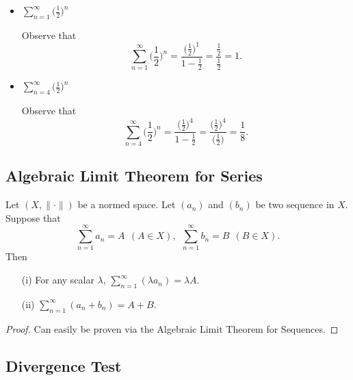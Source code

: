 \documentclass[a4paper]{article}
\begin{document}
\begin{eg}
    \begin{itemize}
        \item \( \sum_{ n=1  }^{ \infty   } \Big(  \frac{ 1 }{ 2 }  \Big)^{n} \)

            Observe that 
            \[  \sum_{ n=1  }^{ \infty  } \Big(  \frac{ 1 }{ 2 }  \Big)^{n} = \frac{ \Big(  \frac{ 1 }{ 2 }  \Big)^{1} }{  1 - \frac{ 1 }{ 2 }  }  = \frac{ \frac{ 1 }{ 2 }  }{ \frac{ 1 }{ 2 }  }  = 1.  \]

        \item \( \sum_{ n=4 }^{ \infty  } \Big(  \frac{ 1 }{ 2 }  \Big)^{n}  \)

            Observe that 
            \[  \sum_{ n=4 }^{ \infty  } \Big(  \frac{ 1 }{ 2 }  \Big)^{n} = \frac{ \Big(  \frac{ 1 }{ 2 }  \Big)^{4} }{  1 - \frac{ 1 }{ 2 }  } = \frac{ \Big(  \frac{ 1 }{ 2 }  \Big)^{4} }{  \Big(  \frac{ 1 }{ 2 }  \Big) }  = \frac{ 1 }{ 8 }. \]
    \end{itemize}
\end{eg}

\subsection{Algebraic Limit Theorem for Series}\label{Algebraic Limit Theorem for Series}

\begin{theorem}[ ]
    Let \( (X , \|\cdot\|) \) be a normed space. Let \( ({a}_{n}) \) and \( ({b}_{n}) \) be two sequence in \( X  \). Suppose that 
    \[  \sum_{ n=1  }^{ \infty  } {a}_{n} = A \ \ (A \in X) , \ \ \sum_{ n=1  }^{ \infty  } {b}_{n} = B \ \ (B \in X). \]
    Then
    \begin{enumerate}
        \item[(i)] For any scalar \( \lambda  \), \( \sum_{ n=1  }^{ \infty   } (\lambda {a}_{n}) = \lambda A  \).
        \item[(ii)] \( \sum_{ n=1  }^{ \infty  } ({a}_{n} + {b}_{n}) = A + B \).
    \end{enumerate}
\end{theorem}
\begin{proof}
Can easily be proven via the Algebraic Limit Theorem for Sequences.
\end{proof}

\subsection{Divergence Test}\label{Divergence Test}
\end{document}

